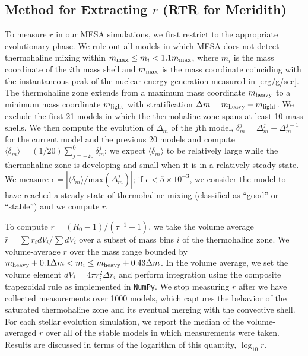 \subsection{Method for Extracting $r$ \textbf{(RTR for Meridith)}}
To measure $r$ in our MESA simulations, we first restrict to the appropriate evolutionary phase.
We rule out all models in which MESA does not detect thermohaline mixing within $m_{\rm max} \leq m_i < 1.1 m_{\rm max}$, where $m_i$ is the mass coordinate of the $i$th mass shell and $m_{\rm max}$ is the mass coordinate coinciding with the instantaneous peak of the nuclear energy generation measured in [erg/g/sec].
The thermohaline zone extends from a maximum mass coordinate $m_{\rm heavy}$ to a minimum mass coordinate $m_{\rm light}$ with stratification $\Delta m = m_{\rm heavy} - m_{\rm light}$.
We exclude the first 21 models in which the thermohaline zone spans at least 10 mass shells.
We then compute the evolution of $\Delta_{m}$ of the $j$th model, $\delta_m^j = \Delta_m^{j} - \Delta_m^{j-1}$ for the current model and the previous 20 models and compute $\langle \delta_m \rangle = (1/20)\sum_{j=-20}^0 \delta_m^j$; we expect $\langle \delta_m \rangle$ to be relatively large while the thermohaline zone is developing and small when it is in a relatively steady state.
We measure $\epsilon = |\langle \delta_m \rangle / \mathrm{max}(\Delta_m^j)|$; if $\epsilon < 5 \times 10^{-3}$, we consider the model to have reached a steady state of thermohaline mixing (classified as ``good'' or ``stable'') and we compute $r$.

To compute $r = (R_0 - 1)/(\tau^{-1} - 1)$, we take the volume average $\bar{r} = \sum r_i dV_i / \sum dV_i$ over a subset of mass bins $i$ of the thermohaline zone.
We volume-average $r$ over the mass range bounded by $m_{\rm{heavy}} + 0.1\Delta m  < m_i \leq m_{\rm heavy} + 0.43\Delta m$.
In the volume average, we set the volume element $dV_i = 4\pi r_i^2 \Delta r_i$ and perform integration using the composite trapezoidal rule as implemented in \texttt{NumPy}.
We stop measuring $r$ after we have collected measurements over 1000 models, which captures the behavior of the saturated thermohaline zone and its eventual merging with the convective shell.
For each stellar evolution simulation, we report the median of the volume-averaged $r$ over all of the stable models in which measurements were taken. 
Results are discussed in terms of the logarithm of this quantity, $\log_{10} r$.